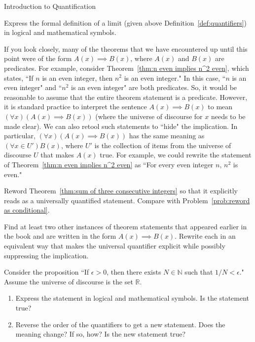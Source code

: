 \begin{section}{Introduction to Quantification}
\begin{problem}
Express the formal definition of a limit (given above Definition~\ref{def:quantifiers}) in logical and mathematical symbols.
\end{problem}

If you look closely, many of the theorems that we have encountered up until this point were of the form $A(x)\implies B(x)$, where $A(x)$ and $B(x)$ are predicates.  For example, consider Theorem~\ref{thm:n even implies n^2 even}, which states, ``If $n$ is an even integer, then $n^2$ is an even integer." In this case, ``$n$ is an even integer" and ``$n^2$ is an even integer" are both predicates.  So, it would be reasonable to assume that the entire theorem statement is a predicate.  However, it is standard practice to interpret the sentence $A(x)\implies B(x)$ to mean $(\forall x)(A(x)\implies B(x))$ (where the universe of discourse for $x$ needs to be made clear). We can also retool such statements to ``hide" the implication. In particular, $(\forall x)(A(x)\implies B(x))$ has the same meaning as $(\forall x \in U')B(x)$, where $U'$ is the collection of items from the universe of discourse $U$ that makes $A(x)$ true. For example, we could rewrite the statement of Theorem~\ref{thm:n even implies n^2 even} as ``For every even integer $n$, $n^2$ is even."

\begin{problem}
Reword Theorem~\ref{thm:sum of three consecutive integers} so that it explicitly reads as a universally quantified statement. Compare with Problem~\ref{prob:reword as conditional}.
\end{problem}

\begin{problem}
Find at least two other instances of theorem statements that appeared earlier in the book and are written in the form $A(x)\implies B(x)$. Rewrite each in an equivalent way that makes the universal quantifier explicit while possibly suppressing the implication.
\end{problem}

\begin{problem}
Consider the proposition ``If $\epsilon >0$, then there exists $N\in\mathbb{N}$ such that $1/N<\epsilon$."  Assume the universe of discourse is the set $\mathbb{R}$.
\begin{enumerate}[label=\textrm{(\alph*)}]
\item Express the statement in logical and mathematical symbols. Is the statement true?
\item Reverse the order of the quantifiers to get a new statement. Does the meaning change?  If so, how?  Is the new statement true?
\end{enumerate}
\end{problem}


\end{section}
